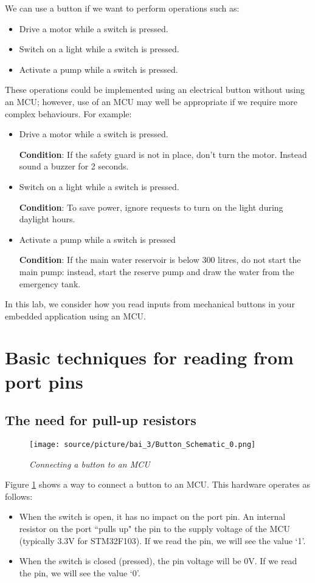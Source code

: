 We can use a button if we want to perform operations such as:
\begin{itemize}
    \item Drive a motor while a switch is pressed.
    \item Switch on a light while a switch is pressed.
    \item Activate a pump while a switch is pressed.
\end{itemize}
These operations could be implemented using an electrical button without using an MCU; however, use of an MCU may well be appropriate if we require more complex behaviours. For example:
\begin{itemize}
    \item Drive a motor while a switch is pressed. 
    
    \textbf{Condition}: If the safety guard is not in place, don't turn the motor. Instead sound a buzzer for 2 seconds. 
    \item Switch on a light while a switch is pressed.
    
    \textbf{Condition}: To save power, ignore requests to turn on the light during daylight hours. 
    
    \item Activate a pump while a switch is pressed
    
    \textbf{Condition}: If the main water reservoir is below 300 litres, do not start the main pump: instead, start the reserve pump and draw the water from the emergency tank. 
\end{itemize}

In this lab, we consider how you read inputs from mechanical buttons in your embedded application using an MCU. 

\newpage
\section{Basic techniques for reading from port pins}
\subsection{The need for pull-up resistors}
\begin{figure}[!htp]
    \centering
    \texttt{[image: source/picture/bai\_3/Button\_Schematic\_0.png]}
    \caption{\textit{Connecting a button to an MCU}}
    \label{bai4_pic_button_schematic_0}
\end{figure}
Figure \ref{bai4_pic_button_schematic_0} shows a way to connect a button to an MCU. This hardware operates as follows:
\begin{itemize}
    \item When the switch is open, it has no impact on the port pin. An internal resistor on the port ``pulls up" the pin to the supply voltage of the MCU (typically 3.3V for STM32F103). If we read the pin, we will see the value `1'. 
    \item When the switch is closed (pressed), the pin voltage will be 0V. If we read the pin, we will see the value `0'. 
\end{itemize}
 
